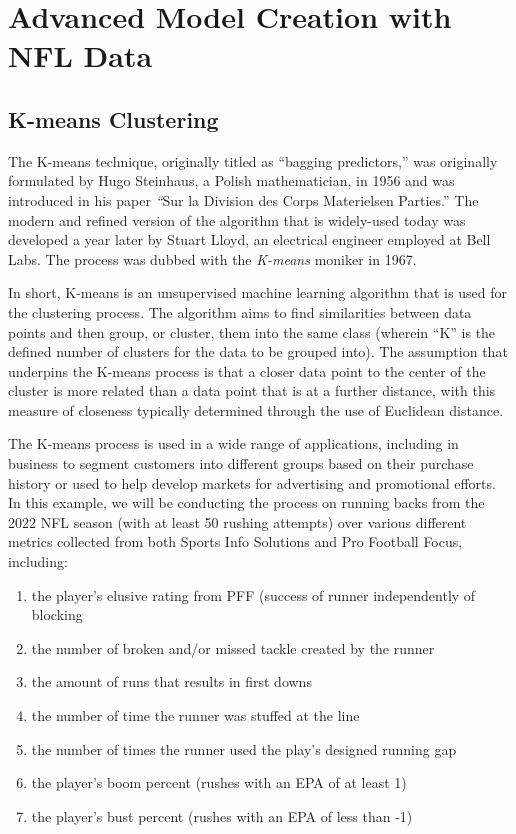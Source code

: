 \documentclass[
  letterpaper,
]{krantz}
\providecommand{\tightlist}{%
  \setlength{\itemsep}{0pt}\setlength{\parskip}{0pt}}\usepackage{longtable,booktabs,array}
\begin{document}
\hypertarget{advanced-model-creation-with-nfl-data-1}{%
\section{Advanced Model Creation with NFL
Data}\label{advanced-model-creation-with-nfl-data-1}}

\hypertarget{k-means-clustering}{%
\subsection{K-means Clustering}\label{k-means-clustering}}

The K-means technique, originally titled as ``bagging predictors,'' was
originally formulated by Hugo Steinhaus, a Polish mathematician, in 1956
and was introduced in his paper \emph{``}Sur la Division des Corps
Materielsen Parties.'' The modern and refined version of the algorithm
that is widely-used today was developed a year later by Stuart Lloyd, an
electrical engineer employed at Bell Labs. The process was dubbed with
the \emph{K-means} moniker in 1967.

In short, K-means is an unsupervised machine learning algorithm that is
used for the clustering process. The algorithm aims to find similarities
between data points and then group, or cluster, them into the same class
(wherein ``K'' is the defined number of clusters for the data to be
grouped into). The assumption that underpins the K-means process is that
a closer data point to the center of the cluster is more related than a
data point that is at a further distance, with this measure of closeness
typically determined through the use of Euclidean distance.

The K-means process is used in a wide range of applications, including
in business to segment customers into different groups based on their
purchase history or used to help develop markets for advertising and
promotional efforts. In this example, we will be conducting the process
on running backs from the 2022 NFL season (with at least 50 rushing
attempts) over various different metrics collected from both Sports Info
Solutions and Pro Football Focus, including:

\begin{enumerate}
\def\labelenumi{\arabic{enumi}.}
\tightlist
\item
  the player's elusive rating from PFF (success of runner independently
  of blocking
\item
  the number of broken and/or missed tackle created by the runner
\item
  the amount of runs that results in first downs
\item
  the number of time the runner was stuffed at the line
\item
  the number of times the runner used the play's designed running gap
\item
  the player's boom percent (rushes with an EPA of at least 1)
\item
  the player's bust percent (rushes with an EPA of less than -1)
\end{enumerate}
\end{document}
